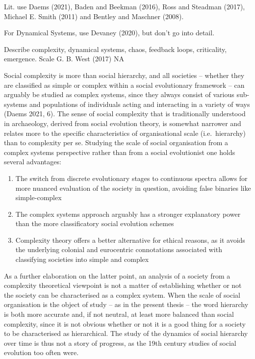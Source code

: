 \documentclass[
  12pt,
  a4paper, twoside]{book}
\begin{document}
Lit. use Daems (2021), Baden and Beekman (2016), Ross and Steadman (2017), Michael E. Smith (2011) and Bentley and Maschner (2008).

For Dynamical Systems, use Devaney (2020), but don't go into detail.

Describe complexity, dynamical systems, chaos, feedback loops, criticality, emergence. Scale G. B. West (2017) NA

Social complexity is more than social hierarchy, and all societies -- whether they are classified as simple or complex within a social evolutionary framework -- can arguably be studied as complex systems, since they always consist of various sub-systems and populations of individuals acting and interacting in a variety of ways (Daems 2021, 6). The sense of social complexity that is traditionally understood in archaeology, derived from social evolution theory, is somewhat narrower and relates more to the specific characteristics of organisational scale (i.e.~hierarchy) than to complexity per se. Studying the scale of social organisation from a complex systems perspective rather than from a social evolutionist one holds several advantages:

\begin{enumerate}
\def\labelenumi{\arabic{enumi}.}
\item
  The switch from discrete evolutionary stages to continuous spectra allows for more nuanced evaluation of the society in question, avoiding false binaries like simple-complex
\item
  The complex systems approach arguably has a stronger explanatory power than the more classificatory social evolution schemes
\item
  Complexity theory offers a better alternative for ethical reasons, as it avoids the underlying colonial and eurocentric connotations associated with classifying societies into simple and complex
\end{enumerate}

As a further elaboration on the latter point, an analysis of a society from a complexity theoretical viewpoint is not a matter of establishing whether or not the society can be characterised as a complex system. When the scale of social organisation is the object of study -- as in the present thesis -- the word hierarchy is both more accurate and, if not neutral, at least more balanced than social complexity, since it is not obvious whether or not it is a good thing for a society to be characterised as hierarchical. The study of the dynamics of social hierarchy over time is thus not a story of progress, as the 19th century studies of social evolution too often were.
\end{document}
